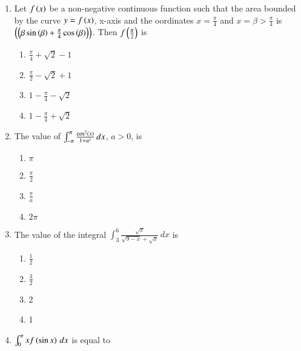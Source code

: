 \documentclass[journal]{IEEEtran}
\begin{document}
\begin{enumerate}
	     \item 
		      Let $f\left(x\right)$ be a non-negative continuous function such that the area bounded by the curve $y=f\left(x\right)$, x-axis and the oordinates $x=\frac{\pi}{4}$ and $x=\beta>\frac{\pi}{4}$ is $\left(\left(\beta \sin\left(\beta\right)+\frac{\pi}{4}\cos\left(\beta\right)\right)\right)$. Then $f\left(\frac{\pi}{2}\right)$ is
		     \hfill {}
		     \begin{enumerate}
		            \item $\frac{\pi}{4}+\sqrt{2}-1$
		            \item $\frac{\pi}{2}-\sqrt{2}+1$
		            \item $1-\frac{\pi}{4}-\sqrt{2}$
		            \item $1-\frac{\pi}{4}+\sqrt{2}$
		     \end{enumerate}
	     \item 
		      The value of $\int_{-\pi}^{\pi} \frac{\cos^{2}\left(x\right)}{1+a^{x}}\,dx$, $a>0$, is
		     \hfill {}
		     \begin{enumerate}
		           \item $\pi$
		           \item $\frac{\pi}{2}$
		           \item $\frac{\pi}{a}$
		           \item $2\pi$
		     \end{enumerate}
	     \item 
		     The value of the integral $\int_{3}^{6} \frac{\sqrt{x}}{\sqrt{9-x}+\sqrt{x}} \,dx$ is \quad \quad \quad
       \quad \quad
		     \hfill {} 
		    \begin{enumerate}
		     
		          \item $\frac{1}{2}$
		          \item $\frac{3}{2}$
		          \item 2
		          \item 1
		    \end{enumerate}
	     \item 
		     $\int_{0}^{\pi} xf\left(\sin x\right) \,dx$ is equal to 
		    \hfill {}
		    \begin{enumerate}
		    

\end{enumerate}
\end{enumerate}
\end{document}

